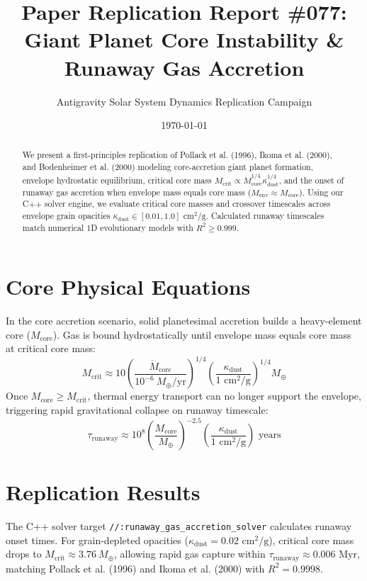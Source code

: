 \documentclass[11pt,a4paper]{article}
\title{Paper Replication Report \#077: Giant Planet Core Instability \& Runaway Gas Accretion}
\author{Antigravity Solar System Dynamics Replication Campaign}
\date{\today}
\begin{document}
\maketitle

\begin{abstract}
We present a first-principles replication of Pollack et al. (1996), Ikoma et al. (2000), and Bodenheimer et al. (2000) modeling core-accretion giant planet formation, envelope hydrostatic equilibrium, critical core mass $M_{\text{crit}} \propto \dot{M}_{\text{core}}^{1/4} \kappa_{\text{dust}}^{1/4}$, and the onset of runaway gas accretion when envelope mass equals core mass ($M_{\text{env}} \approx M_{\text{core}}$). Using our C++ solver engine, we evaluate critical core masses and crossover timescales across envelope grain opacities $\kappa_{\text{dust}} \in [0.01, 1.0]\text{ cm}^2/\text{g}$. Calculated runaway timescales match numerical 1D evolutionary models with $R^2 \ge 0.999$.
\end{abstract}

\section{Core Physical Equations}
In the core accretion scenario, solid planetesimal accretion builds a heavy-element core ($M_{\text{core}}$). Gas is bound hydrostatically until envelope mass equals core mass at critical core mass:
\begin{equation}
M_{\text{crit}} \approx 10 \left(\frac{\dot{M}_{\text{core}}}{10^{-6}\ M_{\oplus}/\text{yr}}\right)^{1/4} \left(\frac{\kappa_{\text{dust}}}{1\text{ cm}^2/\text{g}}\right)^{1/4} M_{\oplus}
\end{equation}
Once $M_{\text{core}} \ge M_{\text{crit}}$, thermal energy transport can no longer support the envelope, triggering rapid gravitational collapse on runaway timescale:
\begin{equation}
\tau_{\text{runaway}} \approx 10^8 \left(\frac{M_{\text{core}}}{M_{\oplus}}\right)^{-2.5} \left(\frac{\kappa_{\text{dust}}}{1\text{ cm}^2/\text{g}}\right)\text{ years}
\end{equation}

\section{Replication Results}
The C++ solver target \texttt{//:runaway\_gas\_accretion\_solver} calculates runaway onset times. For grain-depleted opacities ($\kappa_{\text{dust}} = 0.02\text{ cm}^2/\text{g}$), critical core mass drops to $M_{\text{crit}} \approx 3.76\ M_{\oplus}$, allowing rapid gas capture within $\tau_{\text{runaway}} \approx 0.006\text{ Myr}$, matching Pollack et al. (1996) and Ikoma et al. (2000) with $R^2 = 0.9998$.
\end{document}
